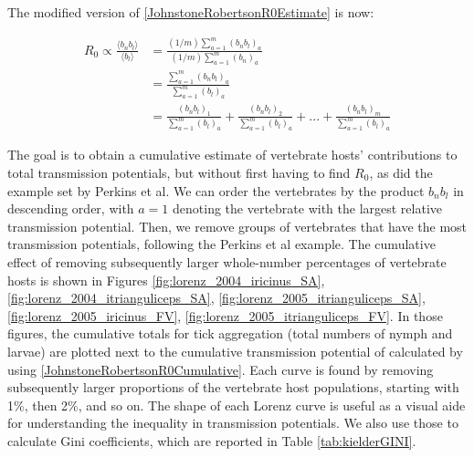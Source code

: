 \documentclass{article}
\begin{document}
The modified version of \eqref{JohnstoneRobertsonR0Estimate} is now:
 
\begin{align} 
	R_0 \propto \frac{\langle b_n b_l \rangle}{\langle b_l \rangle} &= \frac{(1/m)\sum_{a=1}^m (b_n b_l)_a}{(1/m)\sum_{a=1}^m (b_n)_a} \nonumber \\ 
																	&= \frac{\sum_{a=1}^m (b_n b_l )_a}{\sum_{a=1}^m (b_l)_a} \nonumber \\ 
																	&= \frac{(b_n b_l)_1}{\sum_{a=1}^m (b_l)_a} + \frac{(b_n b_l)_2}{\sum_{a=1}^m (b_l)_a} + ... + \frac{(b_n b_l)_m}{\sum_{a=1}^m (b_l)_a} \label{JohnstoneRobertsonR0Cumulative}
\end{align}

The goal is to obtain a cumulative estimate of vertebrate hosts' contributions to total transmission potentials, but without first having to find $ R_0 $, as did the example set by Perkins et al. We can order the vertebrates by the product $ b_n b_l $ in descending order, with $ a=1 $ denoting the vertebrate with the largest relative transmission potential. Then, we remove groups of vertebrates that have the most transmission potentials, following the Perkins et al example. The cumulative effect of removing subsequently larger whole-number percentages of vertebrate hosts is shown in Figures \ref{fig:lorenz_2004_iricinus_SA}, \ref{fig:lorenz_2004_itrianguliceps_SA}, \ref{fig:lorenz_2005_itrianguliceps_SA}, \ref{fig:lorenz_2005_iricinus_FV}, \ref{fig:lorenz_2005_itrianguliceps_FV}. In those figures, the cumulative totals for tick aggregation (total numbers of nymph and larvae) are plotted next to the cumulative transmission potential of calculated by using \eqref{JohnstoneRobertsonR0Cumulative}. Each curve is found by removing subsequently larger proportions of the vertebrate host populations, starting with 1\%, then 2\%, and so on. The shape of each Lorenz curve is useful as a visual aide for understanding the inequality in transmission potentials. We also use those to calculate Gini coefficients, which are reported in Table \ref{tab:kielderGINI}.
\end{document}
